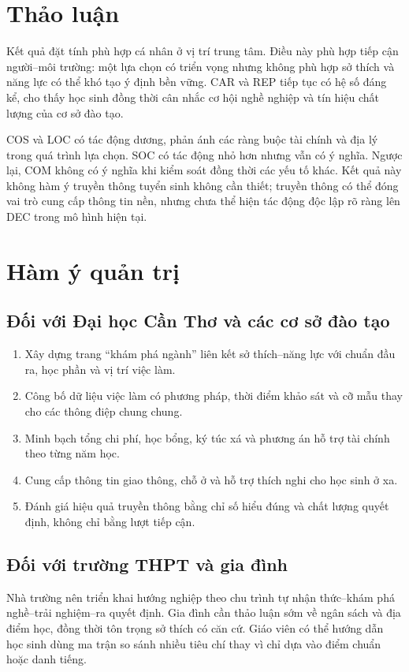 \section{Thảo luận}
Kết quả đặt tính phù hợp cá nhân ở vị trí trung tâm. Điều này phù hợp tiếp cận người--môi trường: một lựa chọn có triển vọng nhưng không phù hợp sở thích và năng lực có thể khó tạo ý định bền vững. CAR và REP tiếp tục có hệ số đáng kể, cho thấy học sinh đồng thời cân nhắc cơ hội nghề nghiệp và tín hiệu chất lượng của cơ sở đào tạo.

COS và LOC có tác động dương, phản ánh các ràng buộc tài chính và địa lý trong quá trình lựa chọn. SOC có tác động nhỏ hơn nhưng vẫn có ý nghĩa. Ngược lại, COM không có ý nghĩa khi kiểm soát đồng thời các yếu tố khác. Kết quả này không hàm ý truyền thông tuyển sinh không cần thiết; truyền thông có thể đóng vai trò cung cấp thông tin nền, nhưng chưa thể hiện tác động độc lập rõ ràng lên DEC trong mô hình hiện tại.

\section{Hàm ý quản trị}
\subsection{Đối với Đại học Cần Thơ và các cơ sở đào tạo}
\begin{enumerate}[label=\arabic*)]
\item Xây dựng trang ``khám phá ngành'' liên kết sở thích--năng lực với chuẩn đầu ra, học phần và vị trí việc làm.
\item Công bố dữ liệu việc làm có phương pháp, thời điểm khảo sát và cỡ mẫu thay cho các thông điệp chung chung.
\item Minh bạch tổng chi phí, học bổng, ký túc xá và phương án hỗ trợ tài chính theo từng năm học.
\item Cung cấp thông tin giao thông, chỗ ở và hỗ trợ thích nghi cho học sinh ở xa.
\item Đánh giá hiệu quả truyền thông bằng chỉ số hiểu đúng và chất lượng quyết định, không chỉ bằng lượt tiếp cận.
\end{enumerate}

\subsection{Đối với trường THPT và gia đình}
Nhà trường nên triển khai hướng nghiệp theo chu trình tự nhận thức--khám phá nghề--trải nghiệm--ra quyết định. Gia đình cần thảo luận sớm về ngân sách và địa điểm học, đồng thời tôn trọng sở thích có căn cứ. Giáo viên có thể hướng dẫn học sinh dùng ma trận so sánh nhiều tiêu chí thay vì chỉ dựa vào điểm chuẩn hoặc danh tiếng.

